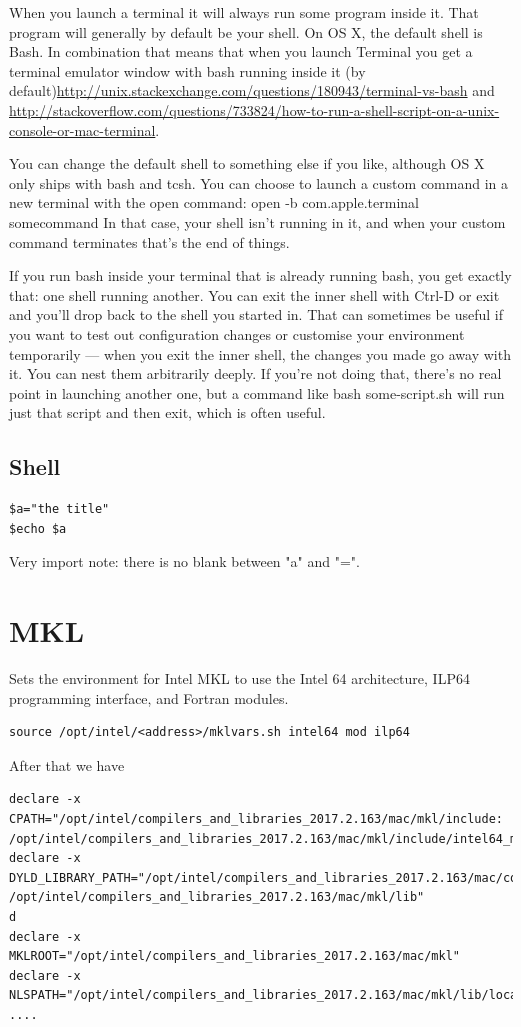 When you launch a terminal it will always run some program inside it. That program will generally by default be your shell. On OS X, the default shell is Bash. In combination that means that when you launch Terminal you get a terminal emulator window with bash running inside it (by default)\url{http://unix.stackexchange.com/questions/180943/terminal-vs-bash} and \url{http://stackoverflow.com/questions/733824/how-to-run-a-shell-script-on-a-unix-console-or-mac-terminal}.

You can change the default shell to something else if you like, although OS X only ships with bash and tcsh. You can choose to launch a custom command in a new terminal with the open command:
open -b com.apple.terminal somecommand
In that case, your shell isn't running in it, and when your custom command terminates that's the end of things.

If you run bash inside your terminal that is already running bash, you get exactly that: one shell running another. You can exit the inner shell with Ctrl-D or exit and you'll drop back to the shell you started in. That can sometimes be useful if you want to test out configuration changes or customise your environment temporarily — when you exit the inner shell, the changes you made go away with it. You can nest them arbitrarily deeply. If you're not doing that, there's no real point in launching another one, but a command like bash some-script.sh will run just that script and then exit, which is often useful.

\section{Shell}

\begin{verbatim}
$a="the title"
$echo $a
\end{verbatim}
Very import note: there is no blank between "a" and "=".


\chapter{MKL}

Sets the environment for Intel MKL to use the Intel 64 architecture, ILP64 programming interface, and Fortran modules.
\begin{verbatim}
source /opt/intel/<address>/mklvars.sh intel64 mod ilp64
\end{verbatim}

After that we have 
\begin{verbatim}
declare -x CPATH="/opt/intel/compilers_and_libraries_2017.2.163/mac/mkl/include:
/opt/intel/compilers_and_libraries_2017.2.163/mac/mkl/include/intel64_mac/ilp64"
declare -x DYLD_LIBRARY_PATH="/opt/intel/compilers_and_libraries_2017.2.163/mac/compiler/lib:
/opt/intel/compilers_and_libraries_2017.2.163/mac/mkl/lib"
d
declare -x MKLROOT="/opt/intel/compilers_and_libraries_2017.2.163/mac/mkl"
declare -x NLSPATH="/opt/intel/compilers_and_libraries_2017.2.163/mac/mkl/lib/locale/%l_%t/%N"
....
\end{verbatim}

